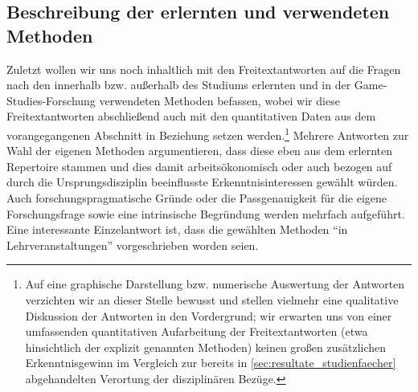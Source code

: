 \documentclass{scrartcl}
\begin{document}
\subsection{Beschreibung der erlernten und verwendeten Methoden}\label{sec:resultate_methoden}
Zuletzt wollen wir uns noch inhaltlich mit den Freitextantworten auf die Fragen nach den innerhalb bzw. außerhalb des Studiums erlernten und in der Game-Studies-Forschung verwendeten Methoden befassen, wobei wir diese Freitextantworten abschließend auch mit den quantitativen Daten aus dem vorangegangenen Abschnitt in Beziehung setzen werden.\footnote{Auf eine graphische Darstellung bzw. numerische Auswertung der Antworten verzichten wir an dieser Stelle bewusst und stellen vielmehr eine qualitative Diskussion der Antworten in den Vordergrund; wir erwarten uns von einer umfassenden quantitativen Aufarbeitung der Freitextantworten (etwa hinsichtlich der explizit genannten Methoden) keinen großen zusätzlichen Erkenntnisgewinn im Vergleich zur bereits in \autoref{sec:resultate_studienfaecher} abgehandelten Verortung der disziplinären Bezüge.}
Mehrere Antworten zur Wahl der eigenen Methoden argumentieren, dass diese eben aus dem erlernten Repertoire stammen und dies damit arbeitsökonomisch oder auch bezogen auf durch die Ursprungsdisziplin beeinflusste Erkenntnisinteressen gewählt würden.
Auch forschungspragmatische Gründe oder die Passgenauigkeit für die eigene Forschungsfrage sowie eine intrinsische Begründung werden mehrfach aufgeführt.
Eine interessante Einzelantwort ist, dass die gewählten Methoden \enquote{in Lehrveranstaltungen} vorgeschrieben worden seien.
\end{document}
